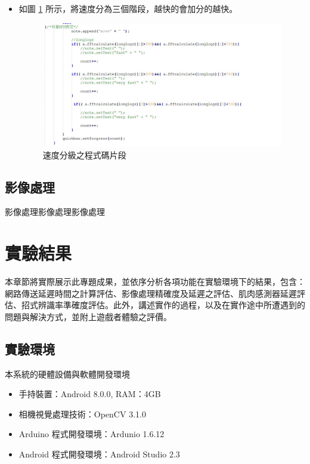 \documentclass[12pt]{article}  %
\theoremstyle{plain}
\begin{document}
\begin{itemize}
\begin{itemize}
\item 如圖 \ref{速度分級之程式碼片段} 所示，將速度分為三個階段，越快的會加分的越快。
\begin{figure}[htbp]
\centering
\includegraphics[width=15cm]{pic/ch3/code-速度分級.JPG}
\caption{速度分級之程式碼片段} \label{速度分級之程式碼片段}
\end{figure}
\end{itemize}
\end{itemize}
\newpage

\subsection{影像處理}
影像處理影像處理影像處理\\
\newpage

\section{實驗結果}
本章節將實際展示此專題成果，並依序分析各項功能在實驗環境下的結果，包含：網路傳送延遲時間之計算評估、影像處理精確度及延遲之評估、肌肉感測器延遲評估、招式辨識率準確度評估。此外，講述實作的過程，以及在實作途中所遭遇到的問題與解決方式，並附上遊戲者體驗之評價。

\subsection{實驗環境}
本系統的硬體設備與軟體開發環境
\begin{itemize}
\item 手持裝置：Android 8.0.0, RAM：4GB
\item 相機視覺處理技術：OpenCV 3.1.0
\item Arduino 程式開發環境：Ardunio 1.6.12
\item Android 程式開發環境：Android Studio 2.3
\end{itemize}
\end{document}
